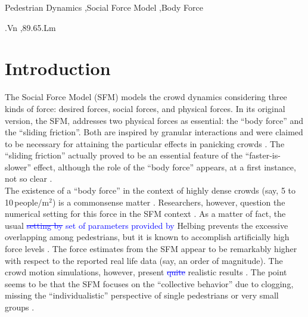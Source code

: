 \documentclass[preprint,12pt]{elsarticle}
\begin{document}
\begin{frontmatter}
\begin{abstract}
\end{abstract}

\begin{keyword}

Pedestrian Dynamics \sep Social Force Model \sep Body Force


.Vn \sep 89.65.Lm

\end{keyword}

\end{frontmatter}


\section{\label{introduction}Introduction}

The Social Force Model (SFM) models the crowd dynamics 
considering three kinds of force: desired forces, social forces, and physical forces.
In its original version, the SFM, addresses two physical forces as essential: 
 the ``body force'' and the ``sliding friction''. Both are 
inspired by granular interactions and were claimed to be necessary  
for attaining the particular effects in panicking crowds \cite{helbing_2000}. 
The ``sliding friction'' actually proved to be an essential feature of the 
``faster-is-slower'' effect, although the role of the ``body force'' appears, 
at a first instance, not so clear \cite{dorso_2005,dorso_2007,dorso_2011}. \\ 

The existence of a ``body force'' in the context of highly dense crowds (say, 5 
to 10$\,$people/m$^2$) is a commonsense matter \cite{henein_2007,fruin_1993}. 
Researchers, however, question the numerical setting for this force in 
the SFM context \cite{lakoba_2005}. As a matter of fact, the usual 
\textcolor{blue}{\sout{setting by} set of parameters provided by }
Helbing prevents the excessive overlapping among pedestrians, but it is known to 
accomplish artificially high force levels 
\cite{helbing_2000,lakoba_2005,langston_2006,lin_2017}. The force estimates 
from the SFM appear to be remarkably higher with respect to the reported real 
life data (say, an order of magnitude). The crowd motion simulations, however, 
present \textcolor{blue}{\sout{quite}} realistic results \cite{lakoba_2005,langston_2006,dorso_2017}. 
The 
point seems to be that the SFM focuses on the ``collective behavior'' due 
to clogging, missing the ``individualistic'' perspective  of single pedestrians 
or very small groups \cite{helbing_2000,henein_2007,narain_2009}.  \\ 
\end{document}
